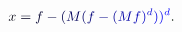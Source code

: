 \documentclass[12pt]{article}
\begin{document}
\makeatletter
\renewcommand*{\@textcolor}[3]{%
  \protect\leavevmode
  \begingroup
    \color#1{#2}#3%
  \endgroup
}
\makeatother
\begin{displaymath}
\mathcolor[RGB]{0,0,15}{x} \mathcolor[RGB]{0,0,30}{=} \mathcolor[RGB]{0,0,45}{f} \mathcolor[RGB]{0,0,60}{-} \mathcolor[RGB]{0,0,75}{(} \mathcolor[RGB]{0,0,90}{M} \mathcolor[RGB]{0,0,105}{(} \mathcolor[RGB]{0,0,120}{f} \mathcolor[RGB]{0,0,135}{-} \mathcolor[RGB]{0,0,150}{(} \mathcolor[RGB]{0,0,165}{M} \mathcolor[RGB]{0,0,180}{f} \mathcolor[RGB]{0,0,195}{)} ^ { \mathcolor[RGB]{0,0,210}{d} } \mathcolor[RGB]{0,0,225}{)} \mathcolor[RGB]{0,0,240}{)} ^ { \mathcolor[RGB]{0,0,255}{d} } \mathcolor[RGB]{0,15,0}{.}
\end{displaymath}
\end{document}
